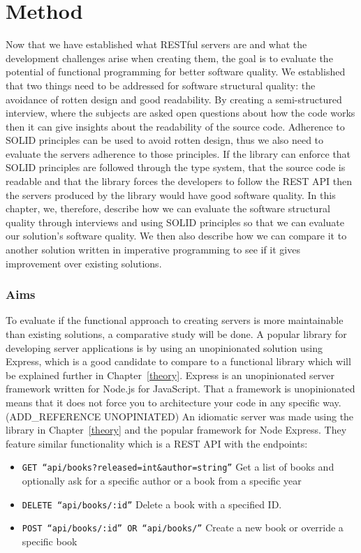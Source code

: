 \chapter{Method}\label{method}

Now that we have established what RESTful servers are and what the development
challenges arise when creating them, the goal is to evaluate the potential of
functional programming for better software quality. We established that two
things need to be addressed for software structural quality: the avoidance of
rotten design and good readability. By creating a semi-structured interview,
where the subjects are asked open questions about how the code works then it can
give insights about the readability of the source code. Adherence to SOLID
principles can be used to avoid rotten design, thus we also need to evaluate the
servers adherence to those principles. If the library can enforce that SOLID
principles are followed through the type system, that the source code is
readable and that the library forces the developers to follow the REST API then
the servers produced by the library would have good software quality. In this
chapter, we, therefore, describe how we can evaluate the software structural
quality through interviews and using SOLID principles so that we can evaluate
our solution's software quality. We then also describe how we can compare it to
another solution written in imperative programming to see if it gives
improvement over existing solutions.

\subsection{Aims}

To evaluate if the functional approach to creating servers is more maintainable
than existing solutions, a comparative study will be done.  A popular library
for developing server applications is by using an unopinionated solution using
Express, which is a good candidate to compare to a functional library which will
be explained further in Chapter~\ref{theory}.  Express is an unopinionated server
framework written for Node.js for JavaScript.  That a framework is unopinionated
means that it does not force you to architecture your code in any specific
way.(ADD\_REFERENCE UNOPINIATED) An idiomatic server was made using the library
in Chapter~\ref{theory} and the popular framework for Node Express. They feature
similar functionality which is a REST API with the endpoints:

\begin{itemize}
    \item \texttt{GET ``api/books?released=int\&author=string''} Get a list of
    books and optionally ask for a specific author or a book from a specific
    year
    \item \texttt{DELETE ``api/books/:id''} Delete a book with a specified ID.
    \item \texttt{POST ``api/books/:id'' OR ``api/books/''} Create a new book or
    override a specific book
\end{itemize}

